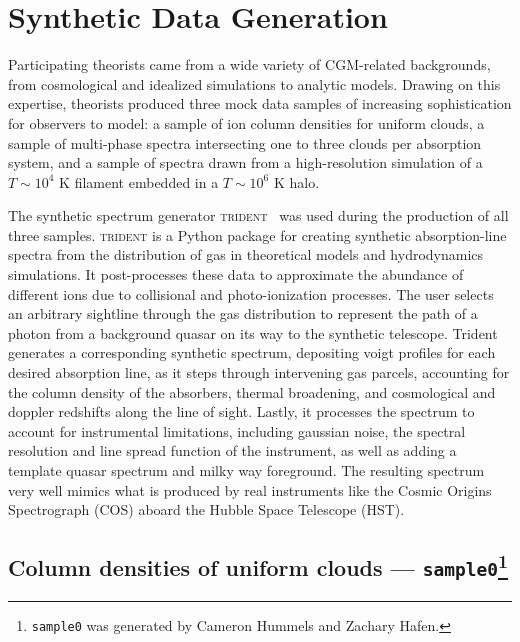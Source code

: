 \documentclass[fleqn,usenatbib]{mnras}
\begin{document}
\section{Synthetic Data Generation}
\label{s: data generation}

Participating theorists came from a wide variety of CGM-related backgrounds, from cosmological and idealized simulations to analytic models.
Drawing on this expertise, theorists produced three mock data samples of increasing sophistication for observers to model:
a sample of ion column densities for uniform clouds,
a sample of multi-phase spectra intersecting one to three clouds per absorption system,
and a sample of spectra drawn from a high-resolution simulation of a $T \sim 10^4$ K filament embedded in a $T \sim 10^6$ K halo.

The synthetic spectrum generator \textsc{trident}~\citep{Hummels2017} was used during the production of all three samples.  \textsc{trident} is a Python package for creating synthetic absorption-line spectra from the distribution of gas in theoretical models and hydrodynamics simulations. It post-processes these data to approximate the abundance of different ions due to collisional and photo-ionization processes.  The user selects an arbitrary sightline through the gas distribution to represent the path of a photon from a background quasar on its way to the synthetic telescope.  Trident generates a corresponding synthetic spectrum, depositing voigt profiles for each desired absorption line, as it steps through intervening gas parcels, accounting for the column density of the absorbers, thermal broadening, and cosmological and doppler redshifts along the line of sight.  Lastly, it processes the  spectrum to account for instrumental limitations, including gaussian noise, the spectral resolution and line spread function of the instrument, as well as adding a template quasar spectrum and milky way foreground.  The resulting spectrum very well mimics what is produced by real instruments like the Cosmic Origins Spectrograph (COS) aboard the Hubble Space Telescope (HST).

\subsection[Column densities of uniform clouds --- \texttt{sample0}]{Column densities of uniform clouds --- \texttt{sample0}\footnote{
\texttt{sample0} was generated by Cameron Hummels and Zachary Hafen.}}
\label{s: data generation -- sample0}
\end{document}
